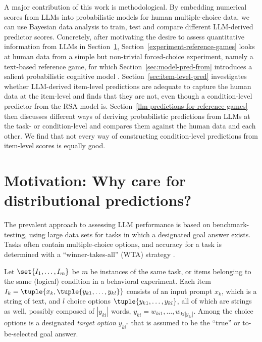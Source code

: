 \documentclass[fleqn]{article}
\begin{document}
A major contribution of this work is methodological.
By embedding numerical scores from LLMs into probabilistic models for human multiple-choice data, we can use Bayesian data analysis to train, test and compare different LLM-derived predictor scores.
Concretely, after motivating the desire to assess quantitative information from LLMs in Section~\ref{motivation}, Section~\ref{experiment-reference-games} looks at human data from a simple but non-trivial forced-choice experiment, namely a text-based reference game, for which Section~\ref{sec:model-pred-from} introduces a salient probabilistic cognitive model \citep{FrankGoodman2012:Predicting-Prag}.
Section~\ref{sec:item-level-pred} investigates whether LLM-derived item-level predictions are adequate to capture the human data at the item-level and finds that they are not, even though a condition-level predictor from the RSA model is.
Section~\ref{llm-predictions-for-reference-games} then discusses different ways of deriving probabilistic predictions from LLMs at the task- or condition-level and compares them against the human data and each other.
We find that not every way of constructing condition-level predictions from item-level scores is equally good.


\section{Motivation: Why care for distributional predictions?}
\label{motivation}

The prevalent approach to assessing LLM performance is based on benchmark-testing, using large data sets for tasks in which a designated goal answer exists.
Tasks often contain multiple-choice options, and accuracy for a task is determined with a ``winner-takes-all'' (WTA) strategy \citep[e.g.,][]{srivastava2023-BIGbench}.

Let $\set{I_{1}, \dots, I_{m}}$ be $m$ be instances of the same task, or items belonging to the same (logical) condition in a behavioral experiment.
Each item $I_{k} = \tuple{x_{k}, \tuple{y_{k1}, \dots, y_{kl}}}$ consists of an input prompt $x_{k}$, which is a string of text, and $l$ choice options $\tuple{y_{k1}, \dots, y_{kl}}$, all of which are strings as well, possibly composed of $|y_{ki}|$ words, $y_{ki} = w_{ki1}, \dots, w_{ki|y_{ki}|}$.
Among the choice options is a designated \emph{target option} $y_{ki^{*}}$ that is assumed to be the ``true'' or to-be-selected goal answer.
\end{document}
